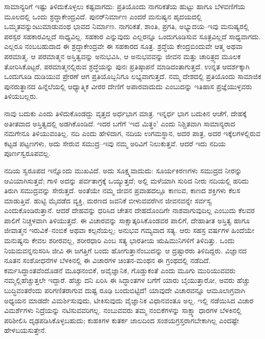 ಸಾಮಾನ್ಯರಿಗೆ ಇಷ್ಟು ತಿಳಿದುಕೊಳ್ಳಲು ಕಷ್ಟವಾಗದು: ಪ್ರತಿಯೊಂದು ನಾಗರಿಕತೆಯ ಹುಟ್ಟು ಹಾಗೂ ಬೆಳವಣಿಗೆಯ ಮೂಲದಲ್ಲಿ ಒಂದು ಶ್ರದ್ಧಾಕೇಂದ್ರವಿದೆ. ಪುನರ್​ನಿರ್ಮಾಣ ಎಂದರೆ ಮನುಷ್ಯನ ಹೃದಯದಲ್ಲಿ ಒಮ್ಮತವನ್ನುಂಟುಮಾಡುವಂಥ ಭಾವದ ನಿರ್ಮಾಣ. ನಾಗರಿಕತೆ, ಶಾಂತಿ, ಪ್ರಗತಿ, ಅಭ್ಯುದಯ–ಇವು ಮನುಷ್ಯರಲ್ಲಿ ಪರಸ್ಪರ ಸಹಕಾರವಿಲ್ಲದೆ ಸಾಧ್ಯವಿಲ್ಲ. ಸಹಕಾರ ಎನ್ನುವುದು ಎಲ್ಲರನ್ನೂ ಒಂದುಗೂಡಿಸುವ ಸೂತ್ರವಿಲ್ಲದೆ ಸಾಧ್ಯವಾಗದು. ಎಲ್ಲರೂ ನಂಬ\-ಬಹು\-ದಾದ ಈ ಶ್ರದ್ಧಾಕೇಂದ್ರವೇ ಈ ಸಹಕಾರದ ಸೂತ್ರ. ಶ್ರದ್ಧೆಯ ಕೇಂದ್ರಬಿಂದುವೇ ಆತ್ಮ ಅಥವಾ ಪರಮಾತ್ಮ. ಆ ಪರಮಾತ್ಮನ ಅಸ್ತಿತ್ವವನ್ನು ಅನುಭವಿಸಿ, ಆ ಅನುಭವವನ್ನು ಜೀವನ ಮತ್ತು ಚಾರಿತ್ರ್ಯದ ಮೂಲಕ ತೋರಿಸಿಕೊಟ್ಟರೆ, ಪರಮಾತ್ಮನಲ್ಲಿರುವ ಶ್ರದ್ಧೆಯನ್ನು ಪುನಃ ಪ್ರತಿಷ್ಠಾಪನೆ ಮಾಡಿದಂತಾಗುತ್ತದೆ. ಉನ್ನತ ಆದರ್ಶಕ್ಕಾಗಿ ಒಂದುಗೂಡಿ ದುಡಿಯುವ ಪ್ರೇರಣೆ ಆಗ ಪ್ರತಿ\-ಯೊಬ್ಬನಿಗೂ ಲಭ್ಯವಾಗುತ್ತದೆ. ನಮ್ಮ ದೇಶದಲ್ಲಿ ಪ್ರತಿಯೊಂದು ಸಾಮಾಜಿಕ ಪುನರುತ್ಥಾನದ ಹಿನ್ನೆಲೆಯಲ್ಲಿ ಆಧ್ಯಾತ್ಮಿಕ ವೀರರ ದೇಣಿಗೆ ಅಪಾರವಾದುದು ಎಂಬುದನ್ನು ಇತಿಹಾಸ ಪ್ರಜ್ಞೆಯುಳ್ಳವರು ತಿಳಿಯಬಲ್ಲರು.

ನಾವು ಬದುಕು ಎಂದು ತಿಳಿದುಕೊಂಡದ್ದು ವೃತ್ತದ ಅರ್ಧಭಾಗ ಮಾತ್ರ. ಇನ್ನರ್ಧ ಭಾಗ ಬದುಕಿನ ಆಚೆಗೆ, ದೇಹಕ್ಕೆ ಅತೀತವಾದ ಅಸ್ತಿತ್ವದಲ್ಲಿ ಅಡಗಿಕೊಂಡಿದೆ. ಇದರ ಬಗೆಗೆ ‘ಇದ ಮಿತ್ಥಂ’ ಎಂದು ನಿಶ್ಚಿತವಾಗಿ ಸಾಮಾನ್ಯರಾದ ನಮಗೇನೂ ತಿಳಿಯುವಂತಿಲ್ಲ. ನದಿ ಎಂದು ಹೇಳಿದಾಗ, ನದಿಯ ಉಗಮಸ್ಥಾನ, ಅದರ ಪಾತ್ರ, ಅದರ ಇಕ್ಕೆಲಗಳಲ್ಲಿರುವ ಕಟ್ಟಡ ಪಟ್ಟಣಗಳು, ಅದು ಸೇರುವ ಸಮುದ್ರ–ಇವು ನಮ್ಮ ಅರಿವಿಗೆ ನಿಲುಕುತ್ತವೆ. ಆದರೆ ಇದು ನದಿಯ ಪೂರ್ಣ\break ಸ್ವರೂಪವಲ್ಲ.

ನದಿಯ ಸ್ವರೂಪದ ಇನ್ನೊಂದು ಮುಖವಿದೆ. ಅದು ಸೂಕ್ಷ್ಮವಾದುದು: ಸೂರ್ಯಕಿರಣಗಳು ಸಮುದ್ರದ ನೀರನ್ನು ಆವಿಯಾಗಿಸುತ್ತವೆ; ಗಾಳಿ ಅದನ್ನು ಪರ್ವತಾಗ್ರಕ್ಕೆ ಒಯ್ಯುತ್ತದೆ; ಅಲ್ಲಿ ಮಳೆಯಾಗಿ ಸುರಿದ ನೀರು ನದಿಯಲ್ಲಿ ಹರಿದು ತಿರುಗಿ ಸಮುದ್ರವನ್ನು ಸೇರುತ್ತದೆ. ಅಂತೆಯೇ ನಮ್ಮ ಜೀವನ ಪ್ರವಾಹದಲ್ಲೂ ಕಾಣುವ, ಕಾಣದ ಶಕ್ತಿಗಳು ಕೆಲಸ ಮಾಡುತ್ತಿವೆ. ಹುಟ್ಟಿ ಮೈವಡೆದ ವ್ಯಕ್ತಿ, ಮರಣದ ಜವನಿಕೆ ಬೀಳುವವರೆಗಿನ ಜೀವನವನ್ನೇ ಸರ್ವಸ್ವ ಎಂದುಕೊಂಡಿರುತ್ತಾನೆ. ಆದರೆ ದೇಹವನ್ನು ಧರಿಸಿದ ಚೇತನ ದೇಹದೊಂದಿಗೇ ನಾಶವಾಗುವುದಿಲ್ಲ ಎಂಬುದು ಕೆಲವರ ಪಾಲಿಗೆ ನಿಚ್ಚಳವಾಗಿ ತಿಳಿಯುತ್ತದೆ. ಈ ವಿಚಾರವನ್ನು ಸಾಕ್ಷಾತ್ಕರಿಸಿಕೊಂಡವರ ಪಾಲಿಗೆ, ದೇಹಾತೀತ ಅಸ್ತಿತ್ವ ಹಾಗೂ ಜೀವಾತ್ಮನ ಇರುವಿಕೆ–ನಂಬಿಕೆ ಅಥವಾ ಕಲ್ಪನೆಯಲ್ಲ; ಅನುಭವ ಗಮ್ಯವಾದ ಸತ್ಯ. ಆರು ಸಹಸ್ರ ವರ್ಷಗಳ ಹಿಂದೆಯೇ ಮನುಷ್ಯನು ಕೇವಲ ಶರೀರವಲ್ಲ, ಶರೀರಧಾರಿ ಎಂಬ ಸತ್ಯ ಭಾರತೀಯ ಋಷಿಮುನಿಗಳಿಗೆ ತಿಳಿದಿತ್ತು. ಒಂದು ನಿಯಮವನ್ನನುಸರಿಸಿ ಜೀವಿ ಈ ಜಗತ್ತಿಗೆ ಬಂದು ಹೋಗುತ್ತಾನೆಂಬುದನ್ನು ಆ ದ್ರಷ್ಟಾರರು ತಿಳಿದಿದ್ದರು. ವಿಜ್ಞಾನದ ನೂತನ ಸಂಶೋಧನೆಗಳ ಬೆಳಕಿನಲ್ಲಿ ಈ ವಿಚಾರಗಳ ಚಿಂತನ-ಮಂಥನ ಈ ಗ್ರಂಥದಲ್ಲಿ ನಡೆದಿದೆ. ಕರ್ಮಸಿದ್ಧಾಂತವೆಂದೊಡನೆ ಮೂಢನಂಬಿಕೆ, ಅವೈಜ್ಞಾನಿಕ, ಗೊಡ್ಡುಕಂತೆ ಎಂದು ಮೂಗು ಮುರಿಯುವವರು ನಮ್ಮಲ್ಲಿ\break ಹೆಚ್ಚುತ್ತಲೇ ಇದ್ದಾರೆ. ಹೆಚ್ಚು ದನಿ ಏರಿಸಿ ಈ ಸಿದ್ಧಾಂತಗಳ ಬಗೆಗೆ ಯಾರು ಬೈಯುತ್ತಾರೋ, ಅವರು ಹೆಚ್ಚು ಬುದ್ಧಿವಂತರೆಂದು ಪರಿಗಣಿತರಾಗುವ ದುಷ್ಟ ರೂಢಿ ಬಂದುಬಿಟ್ಟಿದೆ! ಯಾವುದೇ ವಿಚಾರವನ್ನೂ ಆಮೂಲಾಗ್ರವಾಗಿ ಅಧ್ಯಯನ ಮಾಡದೇ ವಿಮರ್ಶಿಸುವುದು, ಟೀಕಿಸುವುದು ವೈಜ್ಞಾನಿಕ ವಿಧಾನವಂತೂ ಅಲ್ಲ. ಇಲ್ಲಿ ನಡೆಯಿಸಿದ ವಿಚಾರ ವಿಮರ್ಶೆಗಳು ನಿದ್ರೆಯನ್ನು ನಟಿಸುವವರಿಗಲ್ಲ. ನಂಬುವವರು ತಮ್ಮ ನಂಬಿಕೆಗಳನ್ನು ಸಾಕ್ಷ್ಯಾ ಧಾರಗಳ ಬೆಳಕಿನಲ್ಲಿ ಪರಿಶೀಲಿಸಿ ದೃಢಪಡಿಸಿಕೊಳ್ಳಬಹುದು; ಕುಹಕಿಗಳ ಕುತರ್ಕ ಜಾಲದಿಂದ ಸಂಶಯಗ್ರಸ್ತರಾಗಬೇಕಾಗಿಲ್ಲ ಎಂದಷ್ಟೇ ಹೇಳ\break ಬಯಸುತ್ತೇನೆ.

